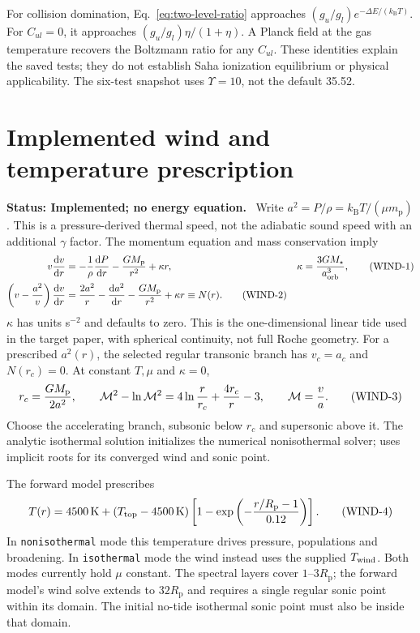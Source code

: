 \documentclass[11pt,a4paper]{article}
\newcommand{\dd}{\mathrm{d}}
\newcommand{\kb}{k_{\mathrm B}}
\newcommand{\mpart}{m_{\mathrm p}}
\newcommand{\Rp}{R_{\mathrm p}}
\newcommand{\status}[1]{\par\noindent\textbf{Status: #1.}\ }
\begin{document}
For collision domination, Eq.~\eqref{eq:two-level-ratio} approaches
$(g_u/g_l)e^{-\Delta E/(\kb T)}$. For $C_{ul}=0$, it approaches
$(g_u/g_l)\eta/(1+\eta)$. A Planck field at the gas temperature recovers the
Boltzmann ratio for any $C_{ul}$. These identities explain the saved tests;
they do not establish Saha ionization equilibrium or physical applicability.
The six-test snapshot uses $\Upsilon=10$, not the default 35.52.

\section{Implemented wind and temperature prescription}\label{sec:wind}
\status{Implemented; no energy equation}
Write $a^2=P/\rho=\kb T/(\mu\mpart)$. This is a pressure-derived thermal
speed, not the adiabatic sound speed with an additional $\gamma$ factor.
The momentum equation and mass conservation imply
\begin{align}
 v\frac{\dd v}{\dd r}
   &=-\frac{1}{\rho}\frac{\dd P}{\dd r}
     -\frac{GM_{\rm p}}{r^2}+\kappa r,
 &\kappa&=\frac{3GM_\star}{a_{\rm orb}^3},
 \tag{WIND-1}\label{eq:momentum}\\
 \left(v-\frac{a^2}{v}\right)\frac{\dd v}{\dd r}
   &=\frac{2a^2}{r}-\frac{\dd a^2}{\dd r}
     -\frac{GM_{\rm p}}{r^2}+\kappa r
     \equiv N(r).
 \tag{WIND-2}\label{eq:wind}
\end{align}
$\kappa$ has units s$^{-2}$ and defaults to zero. This is the one-dimensional
linear tide used in the target paper, with spherical continuity, not full
Roche geometry. For a prescribed $a^2(r)$, the selected regular transonic
branch has $v_c=a_c$ and $N(r_c)=0$. At constant $T,\mu$ and $\kappa=0$,
\begin{equation}
 r_c=\frac{GM_{\rm p}}{2a^2},\qquad
 \mathcal M^2-\ln\mathcal M^2
  =4\ln\frac{r}{r_c}+\frac{4r_c}{r}-3,
 \qquad \mathcal M=\frac{v}{a}.
 \tag{WIND-3}\label{eq:isothermal-wind}
\end{equation}
Choose the accelerating branch, subsonic below $r_c$ and supersonic above it.
The analytic isothermal solution initializes the numerical nonisothermal
solver;  uses implicit roots for its converged wind
and sonic point.

The forward model prescribes
\begin{equation}
 T(r)=4500\,{\rm K}+(T_{\rm top}-4500\,{\rm K})
 \left[1-\exp\left(-\frac{r/\Rp-1}{0.12}\right)\right].
 \tag{WIND-4}\label{eq:temperature}
\end{equation}
In \texttt{nonisothermal} mode this temperature drives pressure, populations
and broadening. In \texttt{isothermal} mode the wind instead uses the supplied
$T_{\rm wind}$. Both modes currently hold $\mu$ constant. The spectral layers
cover $1$--$3\Rp$; the forward model's wind solve extends to $32\Rp$ and
requires a single regular sonic point within its domain. The initial
no-tide isothermal sonic point must also be inside that domain.
\end{document}
